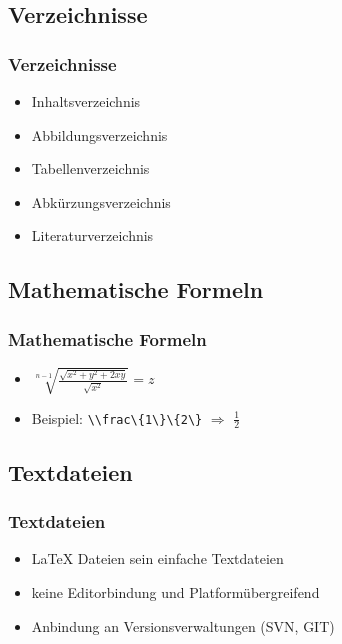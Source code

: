 \documentclass[xcolor=dvipsnames]{beamer}
\begin{document}
\subsection{Verzeichnisse}
\begin{frame}
  \frametitle{Verzeichnisse}
	\begin{block}{}	
		\begin{itemize}
  			\item Inhaltsverzeichnis
  			\item Abbildungsverzeichnis
  			\item Tabellenverzeichnis
	  		\item Abkürzungsverzeichnis
  			\item Literaturverzeichnis
		\end{itemize}
	\end{block}			
\end{frame}

\subsection{Mathematische Formeln}
\begin{frame}
  \frametitle{Mathematische Formeln}
	\begin{block}{}	
		\begin{itemize}
  			\item $\sqrt[n-1] {\frac{\sqrt{x^2+y^2+2xy}}{\sqrt{x^2}}} = z$ \pause
	  		\item Beispiel: \lstinline!\\frac\{1\}\{2\}! $\Rightarrow$ $\frac{1}{2}$ 
		\end{itemize}
	\end{block}			
\end{frame}

\subsection{Textdateien}
\begin{frame}
  \frametitle{Textdateien}
	\begin{block}{}	
		\begin{itemize}
  			\item \LaTeX{} Dateien sein einfache Textdateien
  			\item keine Editorbindung und Platformübergreifend
	  		\item Anbindung an Versionsverwaltungen (SVN, GIT)
		\end{itemize}
	\end{block}	
\end{frame}
\end{document}
